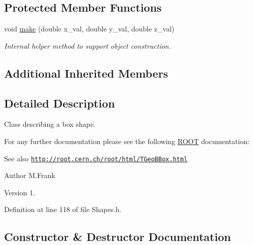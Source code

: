\subsection*{Protected Member Functions}
\begin{DoxyCompactItemize}
\item 
void \hyperlink{class_d_d4hep_1_1_geometry_1_1_box_a063e53830dac233cfbd25c20772fc634}{make} (double x\+\_\+val, double y\+\_\+val, double z\+\_\+val)
\begin{DoxyCompactList}\small\item\em Internal helper method to support object construction. \end{DoxyCompactList}\end{DoxyCompactItemize}
\subsection*{Additional Inherited Members}


\subsection{Detailed Description}
Class describing a box shape. 

For any further documentation please see the following \hyperlink{namespace_r_o_o_t}{R\+O\+OT} documentation\+: \begin{DoxySeeAlso}{See also}
\href{http://root.cern.ch/root/html/TGeoBBox.html}{\tt http\+://root.\+cern.\+ch/root/html/\+T\+Geo\+B\+Box.\+html}
\end{DoxySeeAlso}
\begin{DoxyAuthor}{Author}
M.\+Frank 
\end{DoxyAuthor}
\begin{DoxyVersion}{Version}
1. 
\end{DoxyVersion}


Definition at line 118 of file Shapes.\+h.



\subsection{Constructor \& Destructor Documentation}
\hypertarget{class_d_d4hep_1_1_geometry_1_1_box_a51e906f88284765e01a30a5c562b2202}{}\label{class_d_d4hep_1_1_geometry_1_1_box_a51e906f88284765e01a30a5c562b2202} 
